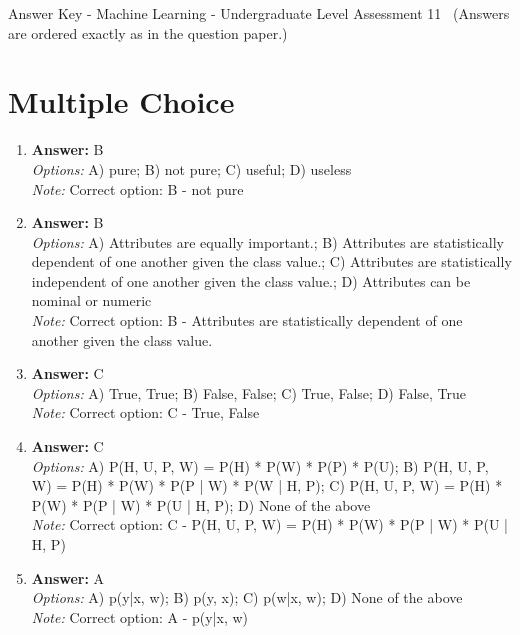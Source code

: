 \documentclass[12pt]{article}
\begin{document}
\begin{center}
Answer Key - Machine Learning - Undergraduate Level Assessment 11 \
\small (Answers are ordered exactly as in the question paper.)
\end{center}

\section*{Multiple Choice}
\begin{enumerate}[label=\arabic*.]
\item \textbf{Answer:} B
\\ \textit{Options:} A) pure; B) not pure; C) useful; D) useless
\\ \textit{Note:} Correct option: B - not pure
\item \textbf{Answer:} B
\\ \textit{Options:} A) Attributes are equally important.; B) Attributes are statistically dependent of one another given the class value.; C) Attributes are statistically independent of one another given the class value.; D) Attributes can be nominal or numeric
\\ \textit{Note:} Correct option: B - Attributes are statistically dependent of one another given the class value.
\item \textbf{Answer:} C
\\ \textit{Options:} A) True, True; B) False, False; C) True, False; D) False, True
\\ \textit{Note:} Correct option: C - True, False
\item \textbf{Answer:} C
\\ \textit{Options:} A) P(H, U, P, W) = P(H) * P(W) * P(P) * P(U); B) P(H, U, P, W) = P(H) * P(W) * P(P | W) * P(W | H, P); C) P(H, U, P, W) = P(H) * P(W) * P(P | W) * P(U | H, P); D) None of the above
\\ \textit{Note:} Correct option: C - P(H, U, P, W) = P(H) * P(W) * P(P | W) * P(U | H, P)
\item \textbf{Answer:} A
\\ \textit{Options:} A) p(y|x, w); B) p(y, x); C) p(w|x, w); D) None of the above
\\ \textit{Note:} Correct option: A - p(y|x, w)
\end{enumerate}
\end{document}
